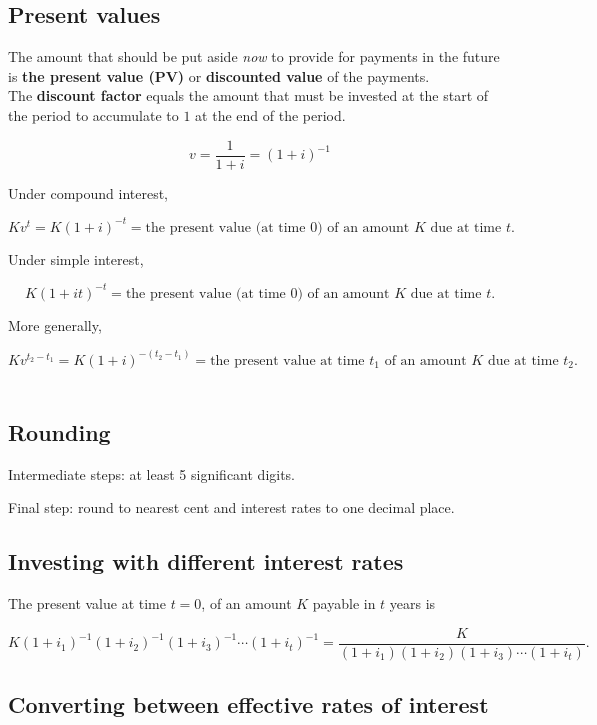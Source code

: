 \documentclass[a4paper, 11pt, twoside]{article}
\begin{document}
\subsection{Present values}

The amount that should be put aside \textit{now} to provide for payments in the future is \textbf{the present value (PV)} or \textbf{discounted value} of the payments.\\

The \textbf{discount factor} equals the amount that must be invested at the start of the period to accumulate to $1$ at the end of the period.

\[v = \frac1{1+i}=(1+i)^{-1}\]

Under compound interest,

\[Kv^t=K(1+i)^{-t} = \text{the present value (at time 0) of an amount $K$ due at time $t$}.\]

Under simple interest,

\[K(1+it)^{-t} = \text{the present value (at time 0) of an amount $K$ due at time $t$}.\]

More generally,

\[Kv^{t_2-t_1} = K(1+i)^{-(t_2-t_1)} = \text{the present value at time $t_1$ of an amount $K$ due at time $t_2$}.\]\\

\subsection{Rounding}

Intermediate steps: at least 5 significant digits.

Final step: round to nearest cent and interest rates to one decimal place.\\

\subsection{Investing with different interest rates}

The present value at time $t=0$, of an amount $K$ payable in $t$ years is

\[K(1+i_1)^{-1}(1+i_2)^{-1}(1+i_3)^{-1}\cdots (1+i_t)^{-1} = \frac{K}{(1+i_1)(1+i_2)(1+i_3)\cdots (1+i_t)}.\]

\subsection{Converting between effective rates of interest}
\end{document}
